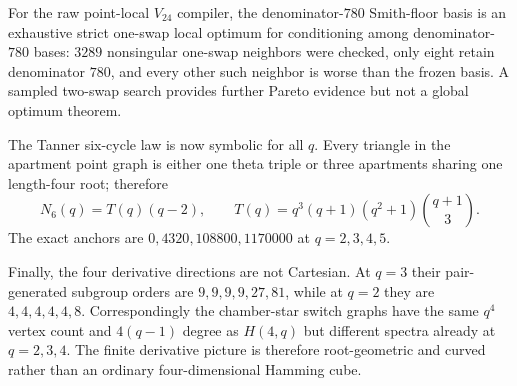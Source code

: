 For the raw point-local $V_{24}$ compiler, the denominator-$780$ Smith-floor basis is an exhaustive strict one-swap local optimum for conditioning among denominator-$780$ bases: $3289$ nonsingular one-swap neighbors were checked, only eight retain denominator $780$, and every other such neighbor is worse than the frozen basis.  A sampled two-swap search provides further Pareto evidence but not a global optimum theorem.

The Tanner six-cycle law is now symbolic for all $q$.  Every triangle in the apartment point graph is either one theta triple or three apartments sharing one length-four root; therefore
\[
 N_6(q)=T(q)(q-2),\qquad
 T(q)=q^3(q+1)(q^2+1)\binom{q+1}{3}.
\]
The exact anchors are $0,4320,108800,1170000$ at $q=2,3,4,5$.

Finally, the four derivative directions are not Cartesian.  At $q=3$ their pair-generated subgroup orders are $9,9,9,9,27,81$, while at $q=2$ they are $4,4,4,4,4,8$.  Correspondingly the chamber-star switch graphs have the same $q^4$ vertex count and $4(q-1)$ degree as $H(4,q)$ but different spectra already at $q=2,3,4$.  The finite derivative picture is therefore root-geometric and curved rather than an ordinary four-dimensional Hamming cube.
\fi

